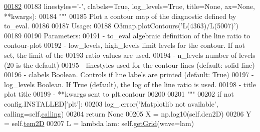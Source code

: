 \begin{DoxyCode}
\hypertarget{classpyneb_1_1core_1_1emis_grid_1_1_emis_grid_l00182}{}\hyperlink{classpyneb_1_1core_1_1emis_grid_1_1_emis_grid_abea5bd314041cdd4be783a7a1d8f99a2}{00182} 
00183                       linestyles=\textcolor{stringliteral}{'-'}, clabels=\textcolor{keyword}{True}, log\_levels=\textcolor{keyword}{True}, title=\textcolor{keywordtype}{None}, ax=\textcolor{keywordtype}{None}, **kwargs):
00184         \textcolor{stringliteral}{"""}
00185 \textcolor{stringliteral}{        Plot a contour map of the diagnostic defined by to\_eval.}
00186 \textcolor{stringliteral}{        }
00187 \textcolor{stringliteral}{        Usage:}
00188 \textcolor{stringliteral}{            O3map.plotContours('L(4363)/L(5007)')}
00189 \textcolor{stringliteral}{        }
00190 \textcolor{stringliteral}{        Parameters:}
00191 \textcolor{stringliteral}{            - to\_eval                   algebraic definition of the line ratio to contour-plot}
00192 \textcolor{stringliteral}{            - low\_levels, high\_levels   limit levels for the contour. If not set, the limit of the }
00193 \textcolor{stringliteral}{                                        ratio values are used.}
00194 \textcolor{stringliteral}{            - n\_levels                  number of levels (20 is the default)}
00195 \textcolor{stringliteral}{            - linestyles                used for the contour lines (default: solid line)}
00196 \textcolor{stringliteral}{            - clabels                   Boolean. Controls if line labels are printed (default: True)}
00197 \textcolor{stringliteral}{            - log\_levels                Boolean. If True (default), the log of the line ratio is used.}
00198 \textcolor{stringliteral}{            - title                     plot title}
00199 \textcolor{stringliteral}{            - **kwargs                  sent to plt.contour}
00200 \textcolor{stringliteral}{            }
00201 \textcolor{stringliteral}{        """} 
00202         \textcolor{keywordflow}{if} \textcolor{keywordflow}{not} config.INSTALLED[\textcolor{stringliteral}{'plt'}]:
00203             log\_.error(\textcolor{stringliteral}{'Matplotlib not available'}, calling=self.\hyperlink{classpyneb_1_1core_1_1emis_grid_1_1_emis_grid_a19820878261ee98513e0b755e688453f}{calling})
00204             \textcolor{keywordflow}{return} \textcolor{keywordtype}{None}
00205         X = np.log10(self.den2D)
00206         Y = self.\hyperlink{classpyneb_1_1core_1_1emis_grid_1_1_emis_grid_ae1904aecb62ca67772b3998cca09fabd}{tem2D}
00207         L = \textcolor{keyword}{lambda} lam: self.\hyperlink{classpyneb_1_1core_1_1emis_grid_1_1_emis_grid_af9a9219e5ddfcfd53c52466e2c2deb44}{getGrid}(wave=lam)

\end{DoxyCode}
